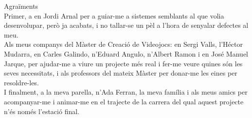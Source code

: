 \newpage

{\LARGE Agraïments}
\\

Primer, a en Jordi Arnal per a guiar-me a sistemes semblants al que volia desenvolupar, però ja acabats, i no tallar-se un pèl a l'hora de senyalar defectes al meu.
\\

Als meus companys del Màster de Creació de Videojocs: en Sergi Valls, l'Héctor Mudarra, en Carles Galindo, n'Eduard Angulo, n'Albert Ramon i en José Manuel Jarque, per ajudar-me a viure un projecte més real i fer-me veure quines són les seves necessitats, i als professors del mateix Màster per donar-me les eines per resoldre-les.
\\

I finalment, a la meva parella, n'Ada Ferran, la meva família i als meus amics per acompanyar-me i animar-me en el trajecte de la carrera del qual aquest projecte n'és només l'estació final.